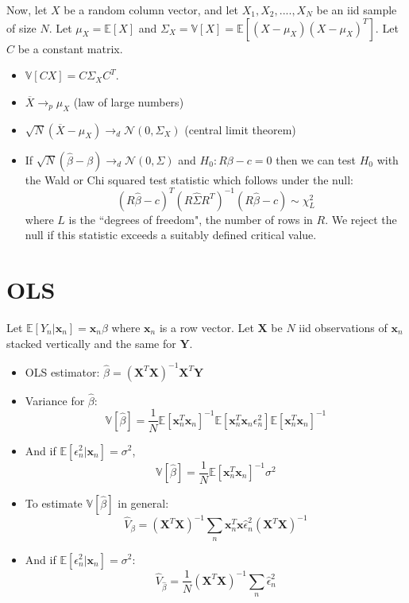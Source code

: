 \documentclass[12pt]{article}
\newcommand\ov{\overline}
\newcommand\BB{\mathbb}
\newcommand\EE{\mathbb{E}}
\newcommand\mc{\mathcal}
\numberwithin{equation}{section}
\numberwithin{figure}{section}
\numberwithin{table}{section}
\begin{document}
    Now, let $X$ be a random column vector, and let $X_1,X_2,....,X_{N}$ be an iid sample of size $N$. Let $\mu_{X}=\EE[X]$ and $\Sigma_{X} = \BB{V}[X] = \EE[(X-\mu_{X})(X-\mu_{X})^T]$. Let $C$ be a constant matrix.
  \begin{itemize}
  \item $\BB{V}[CX] = C\Sigma_{X}C^{T}$.
  \item $\ov{X}\rightarrow_{p} \mu_{X}$ (law of large numbers)
  \item $\sqrt{N}(\ov{X} - \mu_{X}) \rightarrow_{d} \mc{N}(0,\Sigma_{X})$ (central limit theorem)
  \item If $\sqrt{N}(\hat{\beta}-\beta)\rightarrow_{d}\mc{N}(0,\Sigma)$ and $H_{0}: R\beta - c = 0$ then we can test $H_{0}$ with the Wald or Chi squared test statistic which follows under the null:
 \[ (R\hat{\beta}-c)^{T}(R\hat{\Sigma} R^{T})^{-1}(R\hat{\beta}-c) \sim \chi^2_{L} \]
 where $L$ is the ``degrees of freedom", the number of rows in $R$. We reject the null if this statistic exceeds a suitably defined critical value.
  \end{itemize}

  \section*{OLS}
  Let $\EE[Y_{n}|\bm{x}_{n}] = \bm{x}_{n}\beta$ where $\bm{x}_{n}$ is a row vector. Let $\bm{X}$ be $N$ iid observations of $\bm{x}_{n}$ stacked vertically and the same for $\bm{Y}$.
  \begin{itemize}
  \item OLS estimator: $\hat{\beta} = (\bm{X}^{T}\bm{X})^{-1}\bm{X}^{T}\bm{Y}$
  \item Variance for $\hat{\beta}$:
    \[ \BB{V}[\hat{\beta}] =  \frac{1}{N}\EE[\bm{x}_{n}^{T}\bm{x}_n]^{-1}\EE[\bm{x}^{T}_{n}\bm{x}_{n}\epsilon^2_{n}]\EE[\bm{x}_{n}^{T}\bm{x}_n]^{-1} \]
  \item And if $\EE[\epsilon^2_{n}|\bm{x}_{n}] = \sigma^2$,
        \[ \BB{V}[\hat{\beta}] =  \frac{1}{N}\EE[\bm{x}_{n}^{T}\bm{x}_n]^{-1}\sigma^2 \]
      \item  To estimate $\BB{V}[\hat{\beta}]$ in general:
        \[ \hat{V}_{\beta} = (\bm{X}^{T}\bm{X})^{-1}\sum_{n}\bm{x}^{T}_{n}\bm{x}\hat{\epsilon}_{n}^2(\bm{X}^{T}\bm{X})^{-1} \]
        
      \item And if $\EE[\epsilon^2_{n}|\bm{x}_{n}] = \sigma^2$:
        \[\hat{V}_{\hat{\beta}} = \frac{1}{N}(\bm{X}^{T}\bm{X})^{-1}\sum_{n}\hat{\epsilon}_{n}^2 \]
  \end{itemize}
\end{document}
